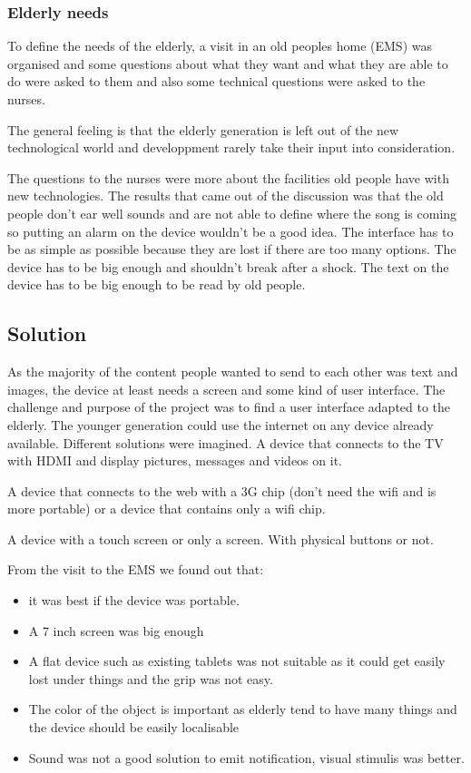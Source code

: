 \subsubsection{Elderly needs}
To define the needs of the elderly, a visit in an old peoples home (EMS) was organised and some questions about what they want and what they are able to do were asked to them and also some technical questions were asked to the nurses.

The general feeling is that the elderly generation is left out of the new technological world and developpment rarely take their input into consideration.

The questions to the nurses were more about the facilities old people have with new technologies. The results that came out of the discussion was that the old people don’t ear well sounds and are not able to define where the song is coming so putting an alarm on the device wouldn’t be a good idea. The interface has to be as simple as possible because they are lost if there are too many options. The device has to be big enough and shouldn’t break after a shock. The text on the device has to be big enough to be read by old people.

\subsection{Solution}
\label{chap: solution}
As the majority of the content people wanted to send to each other was text and images, the device at least needs a screen and some kind of user interface.
The challenge and purpose of the project was to find a user interface adapted to the elderly. The younger generation could use the internet on any device already available.
Different solutions were imagined. A device that connects to the TV with HDMI and display pictures, messages and videos on it.

A device that connects to the web with a 3G chip (don’t need the wifi and is more portable) or a device that contains only a wifi chip.

A device with a touch screen or only a screen. With physical buttons or not.

From the visit to the EMS we found out that:
\begin{itemize}
  \item{it was best if the device was portable. }
  \item{ A 7 inch screen was big enough }
  \item{ A flat device such as existing tablets was not suitable as it could get easily lost under things and the grip was not easy.}
  \item{ The color of the object is important as elderly tend to have many things and the device should be easily localisable}
  \item{ Sound was not a good solution to emit notification, visual stimulis was better.}
\end{itemize}



